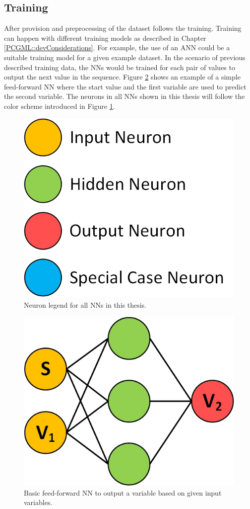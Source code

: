 \documentclass[MGS,Master,english]{twbook}%
\begin{document}
\subsection{Training}
After provision and preprocessing of the dataset follows the training. Training can happen with different training models as described in Chapter \ref{PCGML::devConsiderations}. For example, the use of an \ac{ANN} could be a suitable training model for a given example dataset. In the scenario of previous described training data, the \acp{NN} would be trained for each pair of values to output the next value in the sequence. Figure \ref{fig::PCGML::devExample::NNbasic} shows an example of a simple feed-forward \ac{NN} where the start value and the first variable are used to predict the second variable. The neurons in all \acp{NN} shown in this thesis will follow the color scheme introduced in Figure \ref{fig::neuron_legend}. 
\begin{figure}[!htbp]
	\centering
	\includegraphics[width=0.3\linewidth]{PICs/NNs/neurons_legend.jpg}
	\caption{Neuron legend for all \acp{NN} in this thesis.}\label{fig::neuron_legend}
\end{figure}
\begin{figure}[!htbp]
	\centering
	\includegraphics[width=0.3\linewidth]{PICs/NNs/PCGML_development_example_NN_basic}
	\caption{Basic feed-forward \ac{NN} to output a variable based on given input variables.}\label{fig::PCGML::devExample::NNbasic}
\end{figure}
\end{document}
